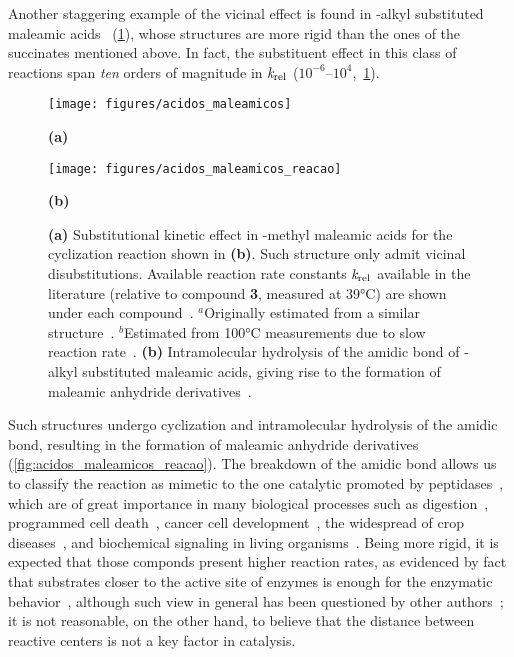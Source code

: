 Another staggering example of the vicinal effect is found in
\emph{}-alkyl substituted maleamic acids~\cite{Kirby_1972,Karaman_2011} (\cref{fig:acidos_maleamicos}),
whose structures are more rigid than the ones of the
succinates mentioned above.
In fact, the substituent effect in this class of reactions span \emph{ten}
orders of magnitude in
$\emph{k}_\text{rel}$ ($10^{-6}$--$10^{4}$,~\cref{fig:acidos_maleamicos}).
%
\begin{figure}[hbtp]
	\centering
	\texttt{[image: figures/acidos\_maleamicos]}

	\textbf{(a)}

	\texttt{[image: figures/acidos\_maleamicos\_reacao]}

	\textbf{(b)}

	\caption[Intramolecular hydrolysis of the amidic bond in maleamic acids and
		their -methyl substitutional kinetic effect.]{
		\textbf{(a)}
		Substitutional kinetic effect in -methyl
		maleamic acids for the cyclization reaction shown in \textbf{(b)}.
		Such structure only admit vicinal disubstitutions.
		Available reaction rate constants $\emph{k}_\text{rel}$ available in
		the literature (relative to compound \textbf{3}, measured at 39°C)
		are shown under each compound~\cite{Kirby_1972}.
		$^a$Originally estimated from a similar structure~\cite{Kirby_1972}.
		$^b$Estimated from 100°C measurements due to slow reaction rate~\cite{Kirby_1972}.
		\textbf{(b)}
		Intramolecular hydrolysis of the amidic bond of \emph{}-alkyl
		substituted maleamic acids, giving rise to the formation of maleamic
		anhydride derivatives~\cite{Kirby_1972,Jung_2005,Karaman_2011}.}%
	\label{fig:acidos_maleamicos_reacao}%
	\label{fig:acidos_maleamicos}
\end{figure}
%
Such structures undergo cyclization and intramolecular hydrolysis of the amidic
bond, resulting in the formation of maleamic anhydride derivatives (\cref{fig:acidos_maleamicos_reacao}).
The breakdown of the amidic bond allows us to classify the reaction as mimetic
to the one catalytic promoted by peptidases~\cite{Kirby_1972},
which are of great importance in many biological processes such as
digestion~\cite{Lehninger_2012}, programmed cell death~\cite{Fesik_2001},
cancer cell development~\cite{Kenny_1989},
the widespread of crop diseases~\cite{Kapust_2000},
and biochemical signaling in living
organisms~\cite{Lehninger_2012,Borissoff_2009}.
Being more rigid, it is expected that those componds present higher reaction
rates, as evidenced by fact that substrates closer to the active site of
enzymes is enough for the enzymatic behavior~\cite{Souza_2017},
although such view in general has been questioned by other authors~\cite{Nobel_2013};
it is not reasonable, on the other hand, to believe that the distance between
reactive centers is not a key factor in catalysis.
